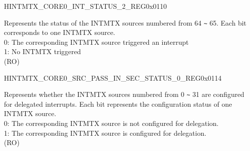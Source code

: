 \begin{register}{H}{INTMTX\_CORE0\_INT\_STATUS\_2\_REG}{0x0110}\label{regdesc:INTMTXCORE0INTSTATUS2REG}
%
\regnewline%
\begin{regdesc}\begin{reglist}
\label{fielddesc:INTMTXCORE0INTSTATUS2}\item [INTMTX\_CORE0\_INT\_STATUS\_2] Represents the status of the INTMTX sources numbered from 64 \verb+~+ 65. Each bit corresponds to one INTMTX source.\\
0: The corresponding INTMTX source triggered an interrupt \\
1: No INTMTX triggered \\(RO)
\end{reglist}\end{regdesc}
\end{register}


\begin{register}{H}{INTMTX\_CORE0\_SRC\_PASS\_IN\_SEC\_STATUS\_0\_REG}{0x0114}\label{regdesc:INTMTXCORE0SRCPASSINSECSTATUS0REG}
%
\regnewline%
\begin{regdesc}\begin{reglist}
\label{fielddesc:INTMTXCORE0INTSRCPASSINSECSTATUS0}\item [INTMTX\_CORE0\_INT\_SRC\_PASS\_IN\_SEC\_STATUS\_0] Represents whether the INTMTX sources numbered from 0 \verb+~+ 31 are configured for delegated interrupts. Each bit represents the configuration status of one INTMTX source.\\

0: The corresponding INTMTX source is not configured for delegation.\\
1: The corresponding INTMTX source is configured for delegation.\\ (RO)
\end{reglist}\end{regdesc}
\end{register}


